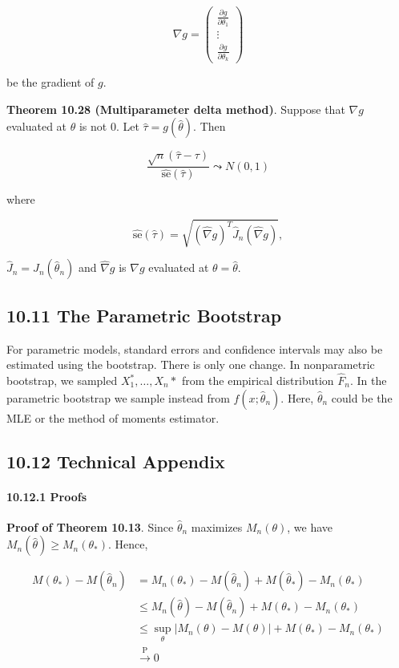 \[ \nabla g = \begin{pmatrix}
\frac{\partial g}{\partial \theta_{1}} \\
\vdots \\
\frac{\partial g}{\partial \theta_{k}}
\end{pmatrix}
\]

be the gradient of \(g\).

\textbf{Theorem 10.28 (Multiparameter delta method)}. Suppose that
\(\nabla g\) evaluated at \(\hat{\theta}\) is not 0. Let
\(\hat{\tau} = g(\hat{\theta})\). Then

\[ \frac{\sqrt{n}(\hat{\tau} - \tau)}{\hat{\text{se}}(\hat{\tau})} \leadsto N(0, 1) \]

where

\[ \hat{\text{se}}(\hat{\tau}) = \sqrt{\left(\hat{\nabla} g \right)^T \hat{J}_{n} \left(\hat{\nabla} g \right)} ,\]

\(\hat{J}_{n} = J_{n}(\hat{\theta}_{n})\) and \(\hat{\nabla}g\) is
\(\nabla g\) evaluated at \(\theta = \hat{\theta}\).

\subsection*{10.11 The Parametric
Bootstrap}\label{the-parametric-bootstrap}

For parametric models, standard errors and confidence intervals may also
be estimated using the bootstrap. There is only one change. In
nonparametric bootstrap, we sampled \(X_{1}^*, \dots, X_{n}*\) from the
empirical distribution \(\hat{F}_{n}\). In the parametric bootstrap we
sample instead from \(f(x; \hat{\theta}_{n})\). Here, \(\hat{\theta}_{n}\)
could be the MLE or the method of moments estimator.

\subsection*{10.12 Technical Appendix}

\paragraph{10.12.1 Proofs}\label{proofs}

\textbf{Proof of Theorem 10.13}. Since \(\hat{\theta}_{n}\) maximizes
\(M_{n}(\theta)\), we have \(M_{n}(\hat{\theta}) \geq M_{n}(\theta_*)\).
Hence,

\begin{align*}
M(\theta_*) - M(\hat{\theta}_{n}) 
&= M_{n}(\theta_*) - M(\hat{\theta}_{n}) + M(\hat{\theta}_*) - M_{n}(\theta_*) \\
&\leq M_{n}(\hat{\theta}) - M(\hat{\theta}_{n}) + M(\theta_*) - M_{n}(\theta_*) \\
&\leq \sup_\theta | M_{n}(\theta) - M(\theta) |  + M(\theta_*)  - M_{n}(\theta_*) \\
&\xrightarrow{\text{P}} 0
\end{align*}


